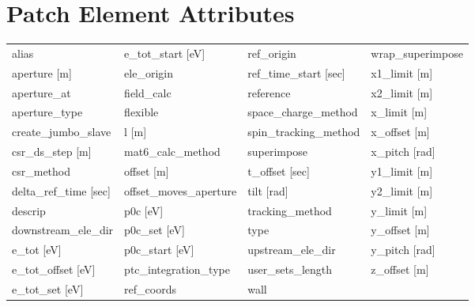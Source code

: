  \section{Patch Element Attributes}
 \label{s:list.patch}
 
 \begin{tabular}{llll} \toprule
alias                            & e_tot_start [eV]                 & ref_origin                       & wrap_superimpose                 \\
aperture [m]                     & ele_origin                       & ref_time_start [sec]             & x1_limit [m]                     \\
aperture_at                      & field_calc                       & reference                        & x2_limit [m]                     \\
aperture_type                    & flexible                         & space_charge_method              & x_limit [m]                      \\
create_jumbo_slave               & l [m]                            & spin_tracking_method             & x_offset [m]                     \\
csr_ds_step [m]                  & mat6_calc_method                 & superimpose                      & x_pitch [rad]                    \\
csr_method                       & offset [m]                       & t_offset [sec]                   & y1_limit [m]                     \\
delta_ref_time [sec]             & offset_moves_aperture            & tilt [rad]                       & y2_limit [m]                     \\
descrip                          & p0c [eV]                         & tracking_method                  & y_limit [m]                      \\
downstream_ele_dir               & p0c_set [eV]                     & type                             & y_offset [m]                     \\
e_tot [eV]                       & p0c_start [eV]                   & upstream_ele_dir                 & y_pitch [rad]                    \\
e_tot_offset [eV]                & ptc_integration_type             & user_sets_length                 & z_offset [m]                     \\
e_tot_set [eV]                   & ref_coords                       & wall                             &                                  \\
 \bottomrule
 \end{tabular}
 \vfill
 
